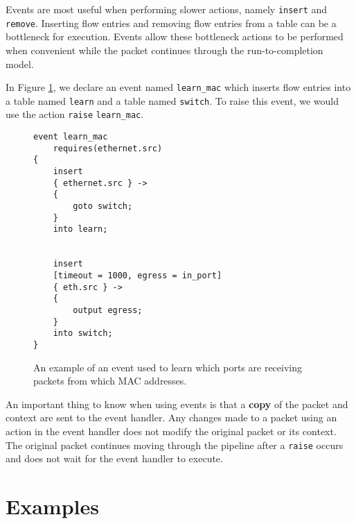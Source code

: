 Events are most useful when performing slower actions, namely \texttt{insert} and \texttt{remove}. Inserting flow entries and removing flow entries from a table can be a bottleneck for execution. Events allow these bottleneck actions to be performed when convenient while the packet continues through the run-to-completion model.

In Figure \ref{fg:event_ex}, we declare an event named \texttt{learn\_mac} which inserts flow entries into a table named \texttt{learn} and a table named \texttt{switch}. To raise this event, we would use the action \texttt{\color{blue}raise} \texttt{learn\_mac}. 

\begin{figure}[ht]
\begin{lstlisting}
event learn_mac
	requires(ethernet.src)
{
	insert
	{ ethernet.src } ->
	{
		goto switch;
	}
	into learn;


	insert
	[timeout = 1000, egress = in_port]
	{ eth.src } ->
	{
		output egress;
	}
	into switch;
}
\end{lstlisting}
\caption{An example of an event used to learn which ports are receiving packets from which MAC addresses.}
\label{fg:event_ex}
\end{figure}

An important thing to know when using events is that a \textbf{copy} of the packet and context are sent to the event handler. Any changes made to a packet using an action in the event handler does not modify the original packet or its context. The original packet continues moving through the pipeline after a \texttt{raise} occurs and does not wait for the event handler to execute.

\section{Examples} \label{examples_tut}